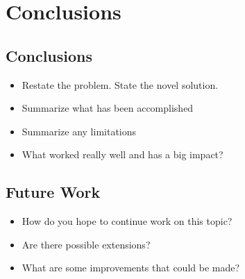 
\glsresetall %
\chapter[Conclusions]{Conclusions}\label{ch:Conclusion}

\section{Conclusions}
\begin{itemize}
	\item{Restate the problem. State the novel solution.}
	\item{Summarize what has been accomplished}
	\item{Summarize any limitations}
	\item{What worked really well and has a big impact?}
\end{itemize}

\section{Future Work}
\begin{itemize}
	\item{How do you hope to continue work on this topic?}
	\item{Are there possible extensions?}
	\item{What are some improvements that could be made?}
\end{itemize}